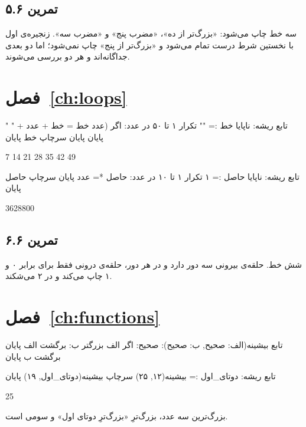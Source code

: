 \subsection*{تمرین ۵.۶}
سه خط چاپ می‌شود: «بزرگ‌تر از ده»، «مضرب پنج» و «مضرب سه». زنجیره‌ی اول
با نخستین شرط درست تمام می‌شود و «بزرگ‌تر از پنج» چاپ نمی‌شود؛ اما دو
 بعدی جداگانه‌اند و هر دو بررسی می‌شوند.

\section*{فصل~\ref{ch:loops}}

\begin{salamfa}
تابع ریشه:
    ناپایا خط := ""
    تکرار ۱ تا ۵۰ در عدد:
        اگر (عدد %
            خط = خط + عدد + " "
        پایان
    پایان
    سرچاپ خط
پایان
\end{salamfa}
\begin{outputfa}
7 14 21 28 35 42 49
\end{outputfa}

\begin{salamfa}
تابع ریشه:
    ناپایا حاصل := ۱
    تکرار ۱ تا ۱۰ در عدد:
        حاصل *= عدد
    پایان
    سرچاپ حاصل
پایان
\end{salamfa}
\begin{outputfa}
3628800
\end{outputfa}

\subsection*{تمرین ۶.۶}
شش خط. حلقه‌ی بیرونی سه دور دارد و در هر دور، حلقه‌ی درونی فقط برای
 برابر ۰ و ۱ چاپ می‌کند و در ۲ می‌شکند.

\section*{فصل~\ref{ch:functions}}

\begin{salamfa}
تابع بیشینه(الف: صحیح, ب: صحیح): صحیح:
    اگر الف بزرگتر ب: برگشت الف پایان
    برگشت ب
پایان

تابع ریشه:
    دوتای_اول := بیشینه(۱۲, ۲۵)
    سرچاپ بیشینه(دوتای_اول, ۱۹)
پایان
\end{salamfa}
\begin{outputfa}
25
\end{outputfa}
بزرگ‌ترین سه عدد، بزرگ‌ترِ «بزرگ‌ترِ دوتای اول» و سومی است.

